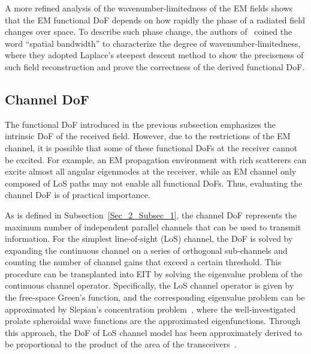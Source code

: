 \documentclass[journal,twocolumn]{IEEEtran}
\begin{document}
A more refined analysis of the wavenumber-limitedness of the EM fields shows that the EM functional DoF depends on how rapidly the phase of a radiated field changes over space. 
To describe such phase change, the authors of~\cite{bucci1987spatial} coined the word ``spatial bandwidth'' to characterize the degree of wavenumber-limitedness, where they adopted Laplace's steepest descent method to show the preciseness of such field reconstruction and prove the correctness of the derived functional DoF. 


\subsection{Channel DoF}
The functional DoF introduced in the previous subsection emphasizes the intrinsic DoF of the received field. 
However, due to the restrictions of the EM channel, it is possible that some of these functional DoFs at the receiver cannot be excited. For example, an EM propagation environment with rich  scatterers can excite almost all angular eigenmodes at the receiver, while an EM channel only composed of LoS paths may not enable all functional DoFs. Thus, evaluating the channel DoF is of practical importance.  

As is defined in Subsection~\ref{Sec_2_Subsec_1}, the channel DoF represents the maximum number of independent parallel channels that can be used to transmit information. 
For the simplest line-of-sight (LoS) channel, the DoF is solved by expanding the continuous channel on a series of orthogonal sub-channels and counting the number of channel gains that exceed a certain threshold. 
This procedure can be transplanted into EIT by solving the eigenvalue problem of the continuous channel operator. 
Specifically, the LoS channel operator is given by the free-space Green's function, and the corresponding eigenvalue problem can be approximated by Slepian's concentration problem~\cite{miller2000communicating}, where the well-investigated prolate spheroidal wave functions are the approximated eigenfunctions.  
Through this approach, the DoF of LoS channel model has been approximately derived to be proportional to the product of the area of the transceivers~\cite{pizzo2022nyquist,miller2000communicating}. 
\end{document}
